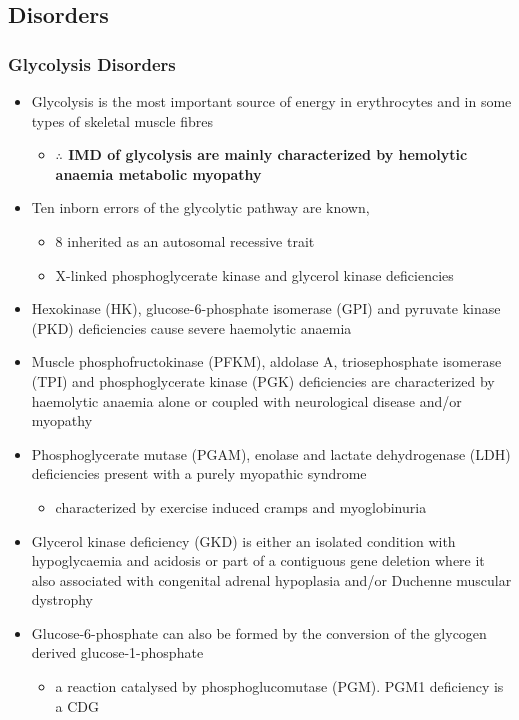 \documentclass{scrartcl}
\begin{document}
\subsection{Disorders}
\label{sec:org5c6b7fe}
\subsubsection{Glycolysis Disorders}
\label{sec:org710c488}
\begin{itemize}
\item Glycolysis is the most important source of energy in erythrocytes
and in some types of skeletal muscle fibres

\begin{itemize}
\item \textbf{\(\therefore\) IMD of glycolysis are mainly characterized by hemolytic}
\textbf{anaemia \textpm{} metabolic myopathy}
\end{itemize}

\item Ten inborn errors of the glycolytic pathway are known,
\begin{itemize}
\item 8 inherited as an autosomal recessive trait
\item X-linked phosphoglycerate kinase and glycerol kinase deficiencies
\end{itemize}

\item Hexokinase (HK), glucose-6-phosphate isomerase (GPI) and pyruvate
kinase (PKD) deficiencies cause severe haemolytic anaemia

\item Muscle phosphofructokinase (PFKM), aldolase A, triosephosphate
isomerase (TPI) and phosphoglycerate kinase (PGK) deficiencies are
characterized by haemolytic anaemia alone or coupled with
neurological disease and/or myopathy

\item Phosphoglycerate mutase (PGAM), enolase and lactate dehydrogenase
(LDH) deficiencies present with a purely myopathic syndrome
\begin{itemize}
\item characterized by exercise induced cramps and myoglobinuria
\end{itemize}

\item Glycerol kinase deficiency (GKD) is either an isolated condition
with hypoglycaemia and acidosis or part of a contiguous
gene deletion where it also associated with congenital adrenal
hypoplasia and/or Duchenne muscular dystrophy

\item Glucose-6-phosphate can also be formed by the conversion of the
glycogen derived glucose-1-phosphate

\begin{itemize}
\item a reaction catalysed by
phosphoglucomutase (PGM). PGM1 deficiency is a CDG
\end{itemize}
\end{itemize}
\end{document}

